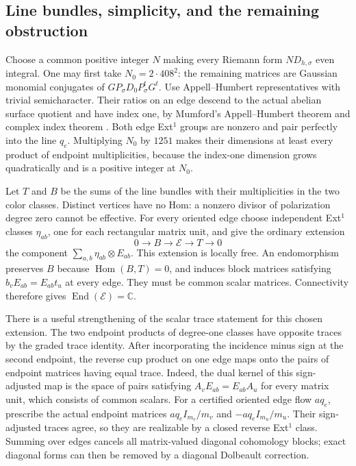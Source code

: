 \subsection{Line bundles, simplicity, and the remaining obstruction}

Choose a common positive integer \(N\) making every Riemann form
\(ND_{h,\sigma}\) even integral.  One may first take
\(N_0=2\cdot408^2\): the remaining matrices are Gaussian
monomial conjugates of \(G P_\sigma D_0P_\sigma^tG^t\).
Use Appell--Humbert representatives with trivial semicharacter.
Their ratios on an edge descend to the actual abelian surface
quotient and have index one, by Mumford's Appell--Humbert theorem
and complex index theorem \cite[\S2, p.~20; \S16, pp.~150,162]{MumfordAV}.
Both edge Ext\({}^1\) groups are nonzero and pair perfectly into
the line \(q_e\).  Multiplying \(N_0\) by \(1251\) makes their
dimensions at least every product of endpoint multiplicities,
because the index-one dimension grows quadratically and is a
positive integer at \(N_0\).

Let \(T\) and \(B\) be the sums of the line bundles with their
multiplicities in the two color classes.  Distinct vertices have
no Hom: a nonzero divisor of polarization degree zero cannot be
effective.  For every oriented edge choose independent Ext\({}^1\)
classes \(\eta_{ab}\), one for each rectangular matrix unit, and
give the ordinary extension
\[
 0\longrightarrow B\longrightarrow\mathcal E\longrightarrow T
 \longrightarrow0
\]
the component \(\sum_{a,b}\eta_{ab}\otimes E_{ab}\).
This extension is locally free.  An endomorphism preserves \(B\)
because \(\operatorname{Hom}(B,T)=0\), and induces block matrices
satisfying \(b_vE_{ab}=E_{ab}t_u\) at every edge.  They must be
common scalar matrices.  Connectivity therefore gives
\(\operatorname{End}(\mathcal E)=\mathbb C\).

There is a useful strengthening of the scalar trace statement for
this chosen extension.  The two endpoint products of degree-one
classes have opposite traces by the graded trace identity.  After
incorporating the incidence minus sign at the second endpoint,
the reverse cup product on one edge maps onto the pairs of endpoint
matrices having equal trace.  Indeed, the dual kernel of this
sign-adjusted map is the space of pairs satisfying
\(A_vE_{ab}=E_{ab}A_u\) for every matrix unit, which consists of
common scalars.  For a certified oriented edge flow \(a q_e\),
prescribe the actual endpoint matrices
\(a q_e I_{m_v}/m_v\) and \(-a q_e I_{m_u}/m_u\).
Their sign-adjusted traces agree, so they are realizable by a
closed reverse Ext\({}^1\) class.  Summing over edges cancels
all matrix-valued diagonal cohomology blocks; exact diagonal forms
can then be removed by a diagonal Dolbeault correction.

